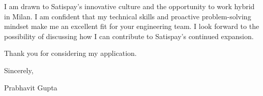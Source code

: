 \documentclass[11pt,a4paper]{article}
\begin{document}
\vspace{1em}
\noindent I am drawn to Satispay's innovative culture and the opportunity to work hybrid in Milan. I am confident that my technical skills and proactive problem-solving mindset make me an excellent fit for your engineering team. I look forward to the possibility of discussing how I can contribute to Satispay's continued expansion.

\vspace{1em}
\noindent Thank you for considering my application.

\vspace{2em}
\noindent Sincerely,

\vspace{2em}
\noindent Prabhavit Gupta
\end{document}
